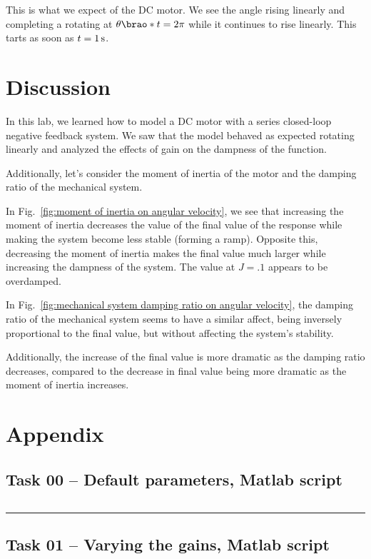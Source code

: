 \documentclass[12pt]{article}
\DeclarePairedDelimiter\brao()%
\def\hr{{\par\noindent\rule{\textwidth}{0.4pt}}}
\begin{document}
This is what we expect of the DC motor. We see the angle rising linearly and completing a rotating at $\theta\brao*t = 2\pi$ while it continues to rise linearly. This tarts as soon as $t = \SI1\second$.

\section{Discussion}
In this lab, we learned how to model a DC motor with a series closed-loop negative feedback system. We saw that the model behaved as expected rotating linearly and analyzed the effects of gain on the dampness of the function.

Additionally, let's consider the 
moment of inertia of the motor
and the damping ratio of the mechanical system.

In Fig.~\ref{fig:moment of inertia on angular velocity}, we see that increasing the moment of inertia decreases the value of the final value of the response while making the system become less stable (forming a ramp). Opposite this, decreasing the moment of inertia makes the final value much larger while increasing the dampness of the system. The value at $J = .1$ appears to be overdamped.

In Fig.~\ref{fig:mechanical system damping ratio on angular velocity}, the damping ratio of the mechanical system seems to have a similar affect, being inversely proportional to the final value, but without affecting the system's stability.

Additionally, the increase of the final value is more dramatic as the damping ratio decreases, compared to the decrease in final value being more dramatic as the moment of inertia increases.

\newpage
\printbibliography

\newpage
\appendix
\section{Appendix}\label{app}

\subsection{Task 00 -- Default parameters, Matlab script}\label{sap:default params}
\inputminted{matlab}{src/lab08_task00_default_dc_motor_motor_params.m}

\hr{}

\subsection{Task 01 -- Varying the gains, Matlab script}\label{sap:vary gains}
\inputminted{matlab}{src/lab08_task01_vary_gain.m}
\end{document}
